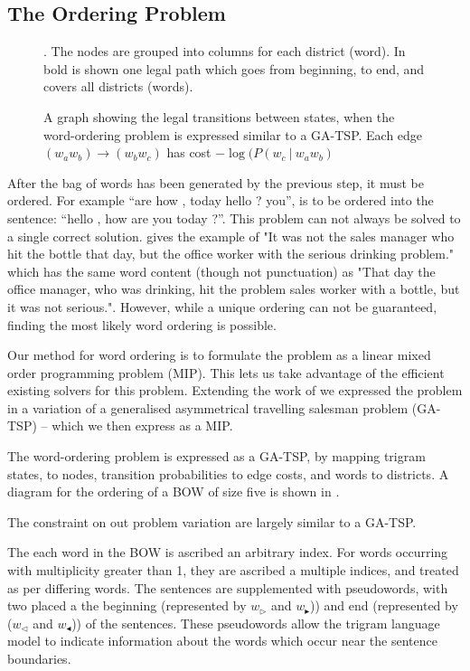 \documentclass[11pt]{article}
\theoremstyle{plain}
\theoremstyle{definition}
\begin{document}
\subsection{The Ordering Problem} \label{ordering}
\begin{figure*}
	
	\caption{\label{fig:ordergraph} A graph showing the legal transitions between states, when the word-ordering problem is expressed similar to a GA-TSP. Each edge $(w_aw_b)\to (w_bw_c)$ has cost $-\log(P(w_c\:|\:w_aw_b)$}. The nodes are grouped into columns for each district (word). In bold is shown one legal path which goes from beginning, to end, and covers all districts (words). 
\end{figure*}

After the bag of words has been generated by the previous step, it must be ordered. For example “are how , today hello ? you”, is to be ordered into the sentence: “hello , how are you today ?”. This problem can not always be solved to a single correct solution. \textcite{Mitchell2008}  gives the example of "It was not the sales manager who hit the bottle that day, but the office worker with the serious drinking problem." which has the same word content (though not punctuation) as "That day the office manager, who was drinking, hit the problem sales worker with a bottle, but it was not serious.". However, while a unique ordering can not be guaranteed, finding the most likely word ordering is possible.

Our method for word ordering is to formulate the problem as a linear mixed order programming problem (MIP). This lets us take advantage of the efficient existing solvers for this problem. Extending the work of \textcite{Horvat2014} we expressed the problem in a variation of a generalised asymmetrical travelling salesman problem (GA-TSP) -- which we then express as a MIP. 

The word-ordering problem is expressed as a GA-TSP, by mapping trigram states, to nodes, transition probabilities to edge costs, and words to districts. A diagram for the ordering of a BOW of size five is shown in .

The constraint on out problem variation are largely similar to a GA-TSP. 

The each word in the BOW is ascribed an arbitrary index. For words occurring with multiplicity greater than 1, they are ascribed a multiple indices, and treated as per differing words. The sentences are supplemented with pseudowords, with two placed a the beginning (represented by $w_\triangleright$ and $w_\blacktriangleright$)) and end (represented by ($w_\triangleleft$ and $w_\blacktriangleleft$)) of the sentences. These pseudowords allow the trigram language model to indicate information about the words which occur near the sentence boundaries.
\end{document}
